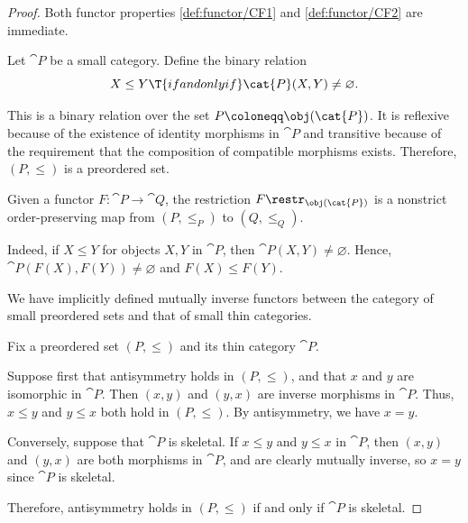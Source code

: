 \begin{proof}
  Both functor properties \ref{def:functor/CF1} and \ref{def:functor/CF2} are immediate.

   Let \( \cat{P} \) be a small category. Define the binary relation
  \begin{equation*}
    X \leq Y \T{if and only if} \cat{P}(X, Y) \neq \varnothing.
  \end{equation*}

  This is a binary relation over the set \( P \coloneqq \obj(\cat{P}) \). It is reflexive because of the existence of identity morphisms in \( \cat{P} \) and transitive because of the requirement that the composition of compatible morphisms exists. Therefore, \( (P, \leq) \) is a preordered set.

  Given a functor \( F: \cat{P} \to \cat{Q} \), the restriction \( F\restr_{\obj(\cat{P})} \) is a nonstrict order-preserving map from \( (P, \leq_P) \) to \( (Q, \leq_Q) \).

  Indeed, if \( X \leq Y \) for objects \( X, Y \) in \( \cat{P} \), then \( \cat{P}(X, Y) \neq \varnothing \). Hence, \( \cat{P}(F(X), F(Y)) \neq \varnothing \) and \( F(X) \leq F(Y) \).

   We have implicitly defined mutually inverse functors between the category of small preordered sets and that of small thin categories.

   Fix a preordered set \( (P, \leq) \) and its thin category \( \cat{P} \).

  Suppose first that antisymmetry holds in \( (P, \leq) \), and that \( x \) and \( y \) are isomorphic in \( \cat{P} \). Then \( (x, y) \) and \( (y, x) \) are inverse morphisms in \( \cat{P} \). Thus, \( x \leq y \) and \( y \leq x \) both hold in \( (P, \leq) \). By antisymmetry, we have \( x = y \).

  Conversely, suppose that \( \cat{P} \) is skeletal. If \( x \leq y \) and \( y \leq x \) in \( \cat{P} \), then \( (x, y) \) and \( (y, x) \) are both morphisms in \( \cat{P} \), and are clearly mutually inverse, so \( x = y \) since \( \cat{P} \) is skeletal.

  Therefore, antisymmetry holds in \( (P, \leq) \) if and only if \( \cat{P} \) is skeletal.
\end{proof}

